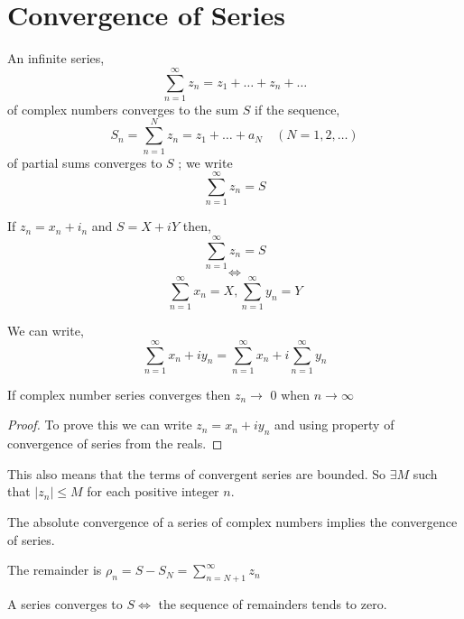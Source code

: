 \section{Convergence of Series}
An infinite series, 
$$ \sum_{n=1}^{\infty} z_n = z_1 + \dots + z_n + \dots $$ 
of complex numbers converges to the sum $S$ if the sequence, 
$$ S_n = \sum_{n=1}^{N} z_n = z_1 + \dots + a_N  \quad (N = 1,2,\dots)$$  of partial sums converges to $S$ ; we write 
$$ \sum_{n=1}^{\infty} z_n = S $$ 


\begin{theorem}
   If $z_n = x_n + i_n$ and $S = X +iY$ then, 
   $$ \sum_{n=1}^{\infty} z_n = S $$ 
   $$ \iff $$ 
   $$ \sum_{n=1}^{\infty} x_n = X, \sum_{n=1}^{\infty} y_n= Y $$ 
\end{theorem}
\begin{remark}
   We can write, 
   $$ \sum_{n=1}^{\infty} x_n + iy_n = \sum_{n=1}^{\infty} x_n + i\sum_{n=1}^{\infty} y_n $$   
\end{remark}

\begin{corollary}
   If complex number series converges then  $z_n \rightarrow$ 0 when $n \rightarrow \infty$ 
\end{corollary}
\begin{proof}
   To prove this we can write $z_n = x_n + iy_n$ and using property of convergence of series from the reals.
\end{proof}

\begin{remark}
   This also means that the terms of convergent series are bounded. So $\exists M$ such that $|z_n| \le M$ for each positive integer $n$.
\end{remark}
\begin{corollary}
   The absolute convergence of a series of complex numbers implies the convergence of series.
\end{corollary}

\vspace{2em}
The remainder is $\rho_n = S - S_N = \sum_{n = N+1}^{\infty} z_n$

\begin{remark}
   A series converges to $S \iff $ the sequence of remainders tends to zero.
\end{remark}


